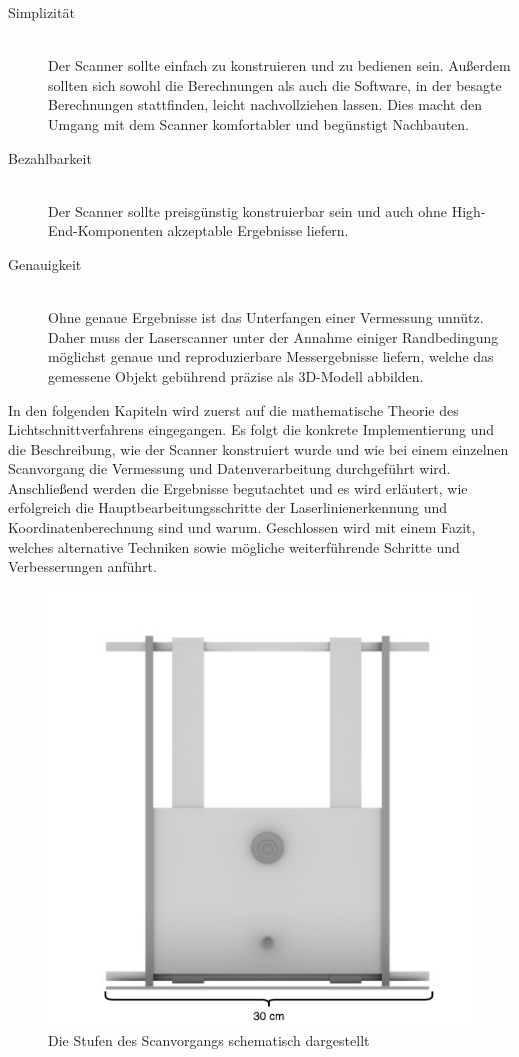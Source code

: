 \begin{description}
\item[Simplizität] \hfill \\
Der Scanner sollte einfach zu konstruieren und zu bedienen sein. Außerdem sollten sich sowohl die Berechnungen als auch die Software, in der besagte Berechnungen stattfinden, leicht nachvollziehen lassen. Dies macht den Umgang mit dem Scanner komfortabler und begünstigt Nachbauten.
\item[Bezahlbarkeit] \hfill \\		
Der Scanner sollte preisgünstig konstruierbar sein und auch ohne High-End-Komponenten akzeptable Ergebnisse liefern.  
\item[Genauigkeit] \hfill \\  		
Ohne genaue Ergebnisse ist das Unterfangen einer Vermessung unnütz. Daher muss der Laserscanner unter der Annahme einiger Randbedingung möglichst genaue und reproduzierbare Messergebnisse liefern, welche das gemessene Objekt gebührend präzise als 3D-Modell abbilden.
\end{description}
In den folgenden Kapiteln wird zuerst auf die mathematische Theorie des Lichtschnittverfahrens eingegangen. Es folgt die konkrete Implementierung und die Beschreibung, wie der Scanner konstruiert wurde und wie bei einem einzelnen Scanvorgang die Vermessung und Datenverarbeitung durchgeführt wird. Anschließend werden die Ergebnisse begutachtet und es wird erläutert, wie erfolgreich die Hauptbearbeitungsschritte der Laserlinienerkennung und Koordinatenberechnung sind und warum. Geschlossen wird mit einem Fazit, welches alternative Techniken sowie mögliche weiterführende Schritte und Verbesserungen anführt.  

\begin{figure}
\includegraphics[width=\textwidth]{images/test.pdf}
\caption{Die Stufen des Scanvorgangs schematisch dargestellt}
\end{figure}

